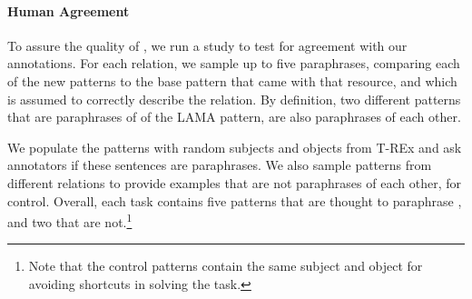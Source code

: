








\paragraph{Human Agreement}
To assure the quality of \resource{}, we run a study to test for agreement with our annotations.
For each relation, we sample up to five paraphrases, comparing each of the new patterns to the base pattern that came with that resource, and which is assumed to correctly describe the relation.
By definition, two different patterns that are paraphrases of of the LAMA pattern, are also paraphrases of each other.

We populate the patterns with random subjects and objects from T-REx \cite{trex} and ask annotators if these sentences are paraphrases.
We also sample patterns from different relations to provide examples that are not paraphrases of each other, for control.
Overall, each task contains five patterns that are thought to paraphrase , and two that are not.\footnote{Note that the control patterns contain the same subject and object for avoiding shortcuts in solving the task.}

